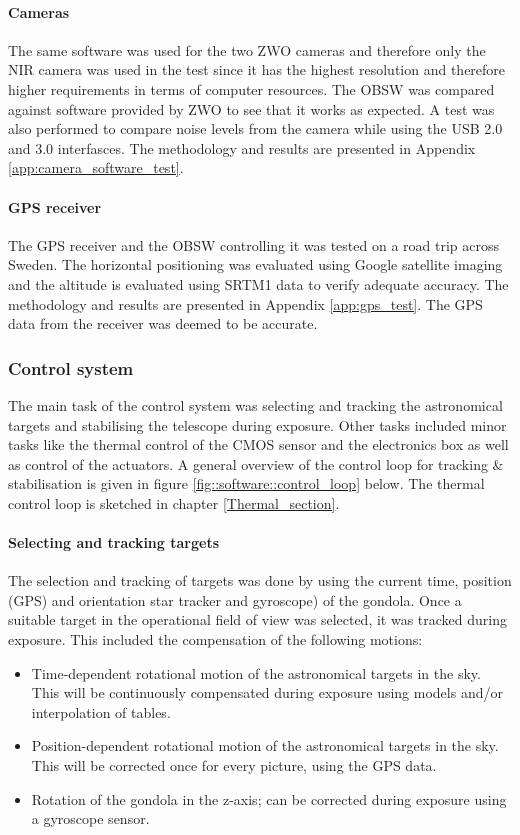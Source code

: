 \paragraph{Cameras}

The same software was used for the two ZWO cameras and therefore only the NIR camera was used in the test since it has the highest resolution and therefore higher requirements in terms of computer resources. The OBSW was compared against software provided by ZWO to see that it works as expected. A test was also performed to compare noise levels from the camera while using the USB 2.0 and 3.0 interfasces. The methodology and results are presented in Appendix \ref{app:camera_software_test}.

\paragraph{GPS receiver}

The GPS receiver and the OBSW controlling it was tested on a road trip across Sweden. The horizontal positioning was evaluated using Google satellite imaging and the altitude is evaluated using SRTM1 data to verify adequate accuracy. The methodology and results are presented in Appendix \ref{app:gps_test}. The GPS data from the receiver was deemed to be accurate.


\subsubsection{Control system}
The main task of the control system was selecting and tracking the astronomical targets and stabilising the telescope during exposure. Other tasks included minor tasks like the thermal control of the CMOS sensor and the electronics box as well as control of the actuators. A general overview of the control loop for tracking \& stabilisation is given in figure  \mbox{\ref{fig::software::control_loop}} below. The thermal control loop is sketched in chapter \mbox{\ref{Thermal_section}}.

\paragraph{Selecting and tracking targets}

The selection and tracking of targets was done by using the current time, position (GPS) and orientation star tracker and gyroscope) of the gondola. Once a suitable target in the operational field of view was selected, it was tracked during exposure. This included the compensation of the following motions:
\begin{itemize}
    \item Time-dependent rotational motion of the astronomical targets in the sky. This will be continuously compensated during exposure using models and/or interpolation of tables.
    \item Position-dependent rotational motion of the astronomical targets in the sky. This will be corrected once for every picture, using the GPS data.
    \item Rotation of the gondola in the z-axis; can be corrected during exposure using a gyroscope sensor.
\end{itemize}

